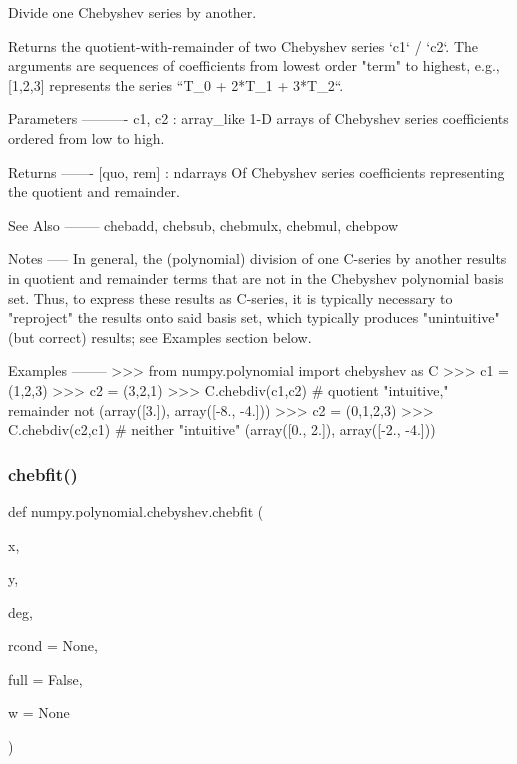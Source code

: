 \begin{DoxyVerb}Divide one Chebyshev series by another.

Returns the quotient-with-remainder of two Chebyshev series
`c1` / `c2`.  The arguments are sequences of coefficients from lowest
order "term" to highest, e.g., [1,2,3] represents the series
``T_0 + 2*T_1 + 3*T_2``.

Parameters
----------
c1, c2 : array_like
    1-D arrays of Chebyshev series coefficients ordered from low to
    high.

Returns
-------
[quo, rem] : ndarrays
    Of Chebyshev series coefficients representing the quotient and
    remainder.

See Also
--------
chebadd, chebsub, chebmulx, chebmul, chebpow

Notes
-----
In general, the (polynomial) division of one C-series by another
results in quotient and remainder terms that are not in the Chebyshev
polynomial basis set.  Thus, to express these results as C-series, it
is typically necessary to "reproject" the results onto said basis
set, which typically produces "unintuitive" (but correct) results;
see Examples section below.

Examples
--------
>>> from numpy.polynomial import chebyshev as C
>>> c1 = (1,2,3)
>>> c2 = (3,2,1)
>>> C.chebdiv(c1,c2) # quotient "intuitive," remainder not
(array([3.]), array([-8., -4.]))
>>> c2 = (0,1,2,3)
>>> C.chebdiv(c2,c1) # neither "intuitive"
(array([0., 2.]), array([-2., -4.]))\end{DoxyVerb}
 \mbox{\label{namespacenumpy_1_1polynomial_1_1chebyshev_ad31c969df42978e2e24e975b835e1674}} 
\subsubsection{\texorpdfstring{chebfit()}{chebfit()}}
{\footnotesize\ttfamily def numpy.\+polynomial.\+chebyshev.\+chebfit (\begin{DoxyParamCaption}\item[{}]{x,  }\item[{}]{y,  }\item[{}]{deg,  }\item[{}]{rcond = {\ttfamily None},  }\item[{}]{full = {\ttfamily False},  }\item[{}]{w = {\ttfamily None} }\end{DoxyParamCaption})}

